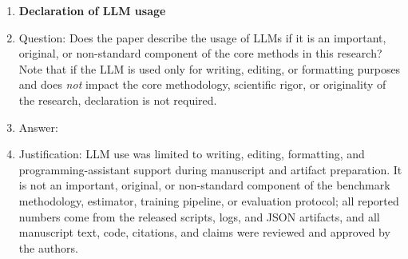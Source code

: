 \begin{enumerate}[leftmargin=*,itemsep=2pt,parsep=0pt,topsep=2pt]
\item {\bf Declaration of LLM usage}
    \item[] Question: Does the paper describe the usage of LLMs if it is an important, original, or non-standard component of the core methods in this research? Note that if the LLM is used only for writing, editing, or formatting purposes and does \emph{not} impact the core methodology, scientific rigor, or originality of the research, declaration is not required.
    \item[] Answer: \answerNA{}
    \item[] Justification: LLM use was limited to writing, editing, formatting, and programming-assistant support during manuscript and artifact preparation. It is not an important, original, or non-standard component of the benchmark methodology, estimator, training pipeline, or evaluation protocol; all reported numbers come from the released scripts, logs, and JSON artifacts, and all manuscript text, code, citations, and claims were reviewed and approved by the authors.

\end{enumerate}
